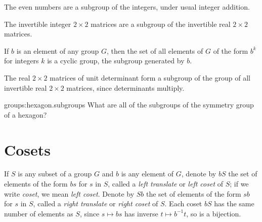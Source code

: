\begin{example}
The even numbers are a subgroup of the integers, under usual integer addition.
\end{example}
\begin{example}
The invertible integer \(2 \times 2\) matrices are a subgroup of the invertible real \(2 \times 2\) matrices.
\end{example}
\begin{example}
If \(b\) is an element of any group \(G\), then the set of all elements of \(G\) of the form \(b^k\) for integers \(k\) is a cyclic group, the subgroup generated by \(b\).
\end{example}
\begin{example}
The real \(2 \times 2\) matrices of unit determinant form a subgroup of the group of all invertible real \(2 \times 2\) matrices, since determinants multiply.
\end{example}
\begin{problem}{groups:hexagon.subgroups}
What are all of the subgroups of the symmetry group of a hexagon?
\end{problem}

\section{Cosets}

If \(S\) is any subset of a group \(G\) and \(b\) is any element of \(G\), denote by \(bS\) the set of elements of the form \(bs\) for \(s\) in \(S\), called a \emph{left translate} or \emph{left coset} of \(S\); if we write \emph{coset}, we mean \emph{left coset}.
Denote by \(Sb\) the set of elements of the form \(sb\) for \(s\) in \(S\), called a \emph{right translate} or \emph{right coset} of \(S\).
Each coset \(bS\) has the same number of elements as \(S\), since \(s \mapsto bs\) has inverse \(t \mapsto b^{-1}t\), so is a bijection.


